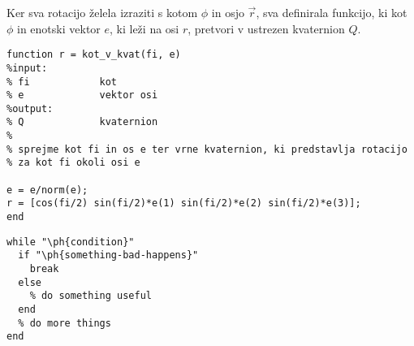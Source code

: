 \documentclass[12pt,a4paper,twoside]{article}
\let\ph\mlplaceholder %
\theoremstyle{definition} %
\theoremstyle{plain} %
\numberwithin{equation}{section}  %
\begin{document}
\noindent Ker sva rotacijo želela izraziti s kotom $\phi$ in osjo $\vec{r}$, sva definirala funkcijo, ki kot $\phi$ in enotski vektor $e$, ki leži na osi $r$, pretvori v ustrezen kvaternion $Q$.

\begin{lstlisting}[caption = {For educational purposes}]
function r = kot_v_kvat(fi, e)
%input:
% fi            kot
% e             vektor osi
%output:
% Q             kvaternion
%
% sprejme kot fi in os e ter vrne kvaternion, ki predstavlja rotacijo 
% za kot fi okoli osi e

e = e/norm(e);
r = [cos(fi/2) sin(fi/2)*e(1) sin(fi/2)*e(2) sin(fi/2)*e(3)];
end
\end{lstlisting}








\begin{lstlisting}[caption = {For educational purposes}]
% example of while loop using placeholders
while "\ph{condition}"
  if "\ph{something-bad-happens}"
    break
  else
    % do something useful
  end
  % do more things
end
\end{lstlisting}
\end{document}
